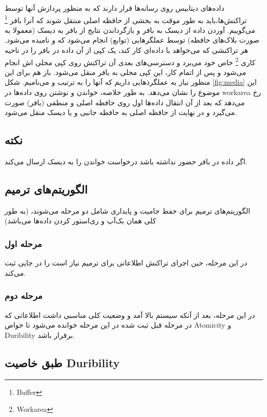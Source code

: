 \documentclass[a4paper]{article}
\begin{document}
داده‌های دیتابیس روی رسانه‌ها قرار دارند که به منظور پردازش آنها توسط
تراکنش‌ها،‌باید به طور موقت به بخشی از حافظه اصلی منتقل شوند که آنرا بافر
\footnote{Buffer} می‌گوییم. آوردن داده از دیسک به بافر و بازگرداندن نتایج از
بافر به دیسک (معمولا به صورت بلاک‌های حافظه) توسط عملگر‌هایی (توابع) انجام
می‌شود که  و  نامیده می‌شود. هر تراکنشی که می‌خواهد با
داده‌ای کار کند، یک کپی از آن داده در بافر را در ناحیه کاری \footnote{Workarea}
خاص خود می‌برد و دسترسی‌های بعدی آن تراکنش روی کپی محلی اش انجام می‌شود و پس از
اتمام کار، این کپی محلی به بافر منقل می‌شود. باز هم برای این منظور نیاز به
عملگرذهایی داریم که آنها را به ترتیب و  می‌نامیم. شکل
\ref{fig:media} این موضوع را نشان می‌دهد. به طور خلاصه، خواندن و نوشتن روی
داده‌ها در workarea رخ می‌دهد که بعد از آن انتقال داده‌ها اول روی حافظه اصلی و
منطقی (بافر) صورت می‌گیرد و در نهایت از حافظه اصلی به حافظه جانبی و یا دیسک منقل
می‌شود.

\subsection*{نکته}

اگر داده در بافر حضور نداشته باشد درخواست خواندن را به دیسک ارسال می‌کند.

\subsection{الگوریتم‌های ترمیم}

الگوریتم‌های ترمیم برای حفظ جامیت و پایداری شامل دو مرحله می‌شوند، (به طور کلی
همان بک‌آپ و ری‌استور کردن داده‌ها می‌باشد)

\subsubsection{مرحله اول}

در این مرحله، حین اجرای تراکنش اطلاعاتی برای ترمیم نیاز است را در جایی ثبت
می‌کند.

\subsubsection{مرحله دوم}

در این مرحله، بعد از آنکه سیستم بالا آمد و وضعیت کلی مناسبی داشت اطلاعاتی که در
مرحله قبل ثبت شده در این مرحله خوانده می‌شود تا خواص Atomicity و Duribility
برقرار باشد.

\subsection*{طبق خاصیت Duribility}
\end{document}
